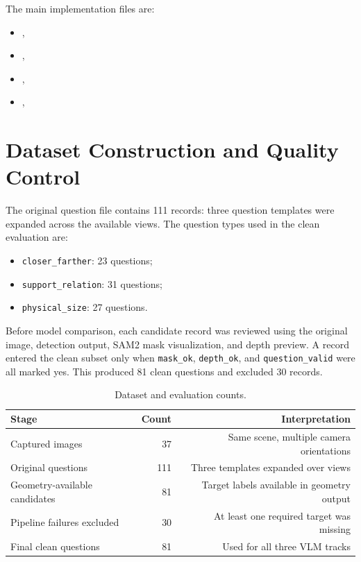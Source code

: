 \documentclass[11pt]{article}
\begin{document}
The main implementation files are:

\begin{itemize}[leftmargin=18pt,itemsep=1pt]
    \item {}, 
    \item {}, 
    \item {}, 
    \item {}, 
\end{itemize}

\section{Dataset Construction and Quality Control}
The original question file contains 111 records: three question templates were expanded across the available views. The question types used in the clean evaluation are:

\begin{itemize}[leftmargin=18pt,itemsep=1pt]
    \item \texttt{closer\_farther}: 23 questions;
    \item \texttt{support\_relation}: 31 questions;
    \item \texttt{physical\_size}: 27 questions.
\end{itemize}

Before model comparison, each candidate record was reviewed using the original image, detection output, SAM2 mask visualization, and depth preview. A record entered the clean subset only when \texttt{mask\_ok}, \texttt{depth\_ok}, and \texttt{question\_valid} were all marked yes. This produced 81 clean questions and excluded 30 records.

\begin{table}[H]
\centering
\caption{Dataset and evaluation counts.}
\label{tab:dataset}
\begin{tabular}{lrr}
\toprule
\textbf{Stage} & \textbf{Count} & \textbf{Interpretation}\\
\midrule
Captured images & 37 & Same scene, multiple camera orientations\\
Original questions & 111 & Three templates expanded over views\\
Geometry-available candidates & 81 & Target labels available in geometry output\\
Pipeline failures excluded & 30 & At least one required target was missing\\
Final clean questions & 81 & Used for all three VLM tracks\\
\bottomrule
\end{tabular}
\end{table}
\end{document}
